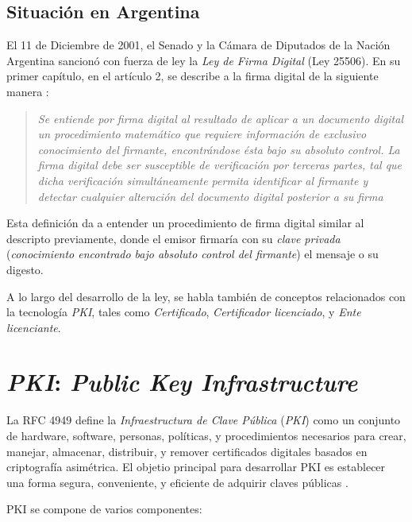 \subsection{Situación en Argentina}

El 11 de Diciembre de 2001, el Senado y la Cámara de Diputados de la Nación Argentina sancionó con fuerza de ley la \emph{Ley de Firma Digital} (Ley 25506). En su primer capítulo, en el artículo 2, se describe a la firma digital de la siguiente manera \autocite{LeyFirmaDigitalCapUno}:

\begin{quote}\itshape
Se entiende por firma digital al resultado de aplicar a un documento digital un procedimiento matemático que requiere información de exclusivo conocimiento del firmante, encontrándose ésta bajo su absoluto control. La firma digital debe ser susceptible de verificación por terceras partes, tal que dicha verificación simultáneamente permita identificar al firmante y detectar cualquier alteración del documento digital posterior a su firma
\end{quote}

Esta definición da a entender un procedimiento de firma digital similar al descripto previamente, donde el emisor firmaría con su \emph{clave privada} (\emph{conocimiento encontrado bajo absoluto control del firmante}) el mensaje o su digesto.

A lo largo del desarrollo de la ley, se habla también de conceptos relacionados con la tecnología \emph{PKI}, tales como \emph{Certificado}, \emph{Certificador licenciado}, y \emph{Ente licenciante}.    

\section{\emph{PKI}: \emph{Public Key Infrastructure}}
La RFC 4949 define la \emph{Infraestructura de Clave Pública} (\emph{PKI}) como un conjunto de hardware, software, personas, políticas, y procedimientos necesarios para crear, manejar, almacenar, distribuir, y remover certificados digitales basados en criptografía asimétrica. El objetio principal para desarrollar PKI es establecer una forma segura, conveniente, y eficiente de adquirir claves públicas \autocite{StallingsPKI}.

PKI se compone de varios componentes:

